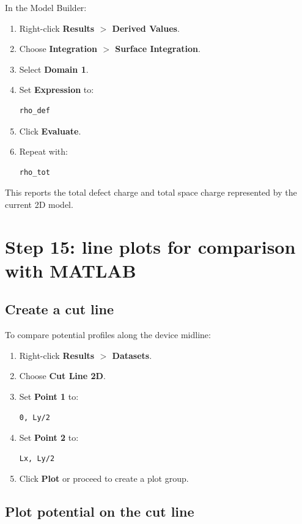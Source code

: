 \documentclass[11pt]{article}
\begin{document}
In the Model Builder:
\begin{enumerate}[leftmargin=2em]
\item Right-click \textbf{Results $>$ Derived Values}.
\item Choose \textbf{Integration $>$ Surface Integration}.
\item Select \textbf{Domain 1}.
\item Set \textbf{Expression} to:
\begin{verbatim}
rho_def
\end{verbatim}
\item Click \textbf{Evaluate}.
\item Repeat with:
\begin{verbatim}
rho_tot
\end{verbatim}
\end{enumerate}

This reports the total defect charge and total space charge represented by the current 2D model.

\section{Step 15: line plots for comparison with MATLAB}

\subsection{Create a cut line}

To compare potential profiles along the device midline:
\begin{enumerate}[leftmargin=2em]
\item Right-click \textbf{Results $>$ Datasets}.
\item Choose \textbf{Cut Line 2D}.
\item Set \textbf{Point 1} to:
\begin{verbatim}
0, Ly/2
\end{verbatim}
\item Set \textbf{Point 2} to:
\begin{verbatim}
Lx, Ly/2
\end{verbatim}
\item Click \textbf{Plot} or proceed to create a plot group.
\end{enumerate}

\subsection{Plot potential on the cut line}
\end{document}
